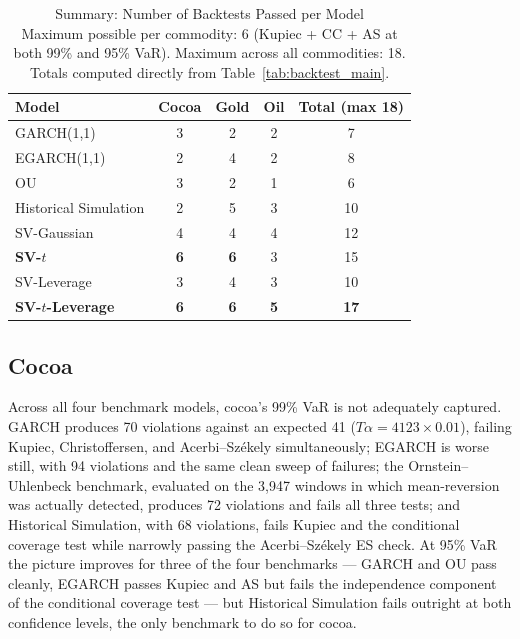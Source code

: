 \documentclass[preprint,12pt,authoryear]{elsarticle}
\begin{document}
\begin{table}[htbp]
\centering
\caption{Summary: Number of Backtests Passed per Model\\[4pt]
\small
Maximum possible per commodity: 6 (Kupiec + CC + AS at both 99\% and 95\% VaR). Maximum across all commodities: 18. Totals computed directly from Table~\ref{tab:backtest_main}.}
\label{tab:summary}
\vspace{6pt}
\begin{tabular}{l ccc c}
\toprule
Model & Cocoa & Gold & Oil & Total (max 18) \\
\midrule
GARCH(1,1)      & 3 & 2 & 2 & \phantom{0}7 \\
EGARCH(1,1)     & 2 & 4 & 2 & \phantom{0}8 \\
OU              & 3 & 2 & 1 & \phantom{0}6 \\
Historical Simulation & 2 & 5 & 3 & 10 \\
SV-Gaussian     & 4 & 4 & 4 & 12 \\
\textbf{SV-$t$} & \textbf{6} & \textbf{6} & 3 & 15 \\
SV-Leverage     & 3 & 4 & 3 & 10 \\
\textbf{SV-$t$-Leverage} & \textbf{6} & \textbf{6} & \textbf{5} & \textbf{17} \\
\bottomrule
\end{tabular}
\end{table}

\subsection{Cocoa}
\label{sec:results_cocoa}

Across all four benchmark models, cocoa's 99\% VaR is not adequately captured. GARCH produces 70 violations against an expected 41 ($T\alpha = 4123 \times 0.01$), failing Kupiec, Christoffersen, and Acerbi--Sz\'ekely simultaneously; EGARCH is worse still, with 94 violations and the same clean sweep of failures; the Ornstein--Uhlenbeck benchmark, evaluated on the 3,947 windows in which mean-reversion was actually detected, produces 72 violations and fails all three tests; and Historical Simulation, with 68 violations, fails Kupiec and the conditional coverage test while narrowly passing the Acerbi--Sz\'ekely ES check. At 95\% VaR the picture improves for three of the four benchmarks --- GARCH and OU pass cleanly, EGARCH passes Kupiec and AS but fails the independence component of the conditional coverage test --- but Historical Simulation fails outright at both confidence levels, the only benchmark to do so for cocoa.
\end{document}
